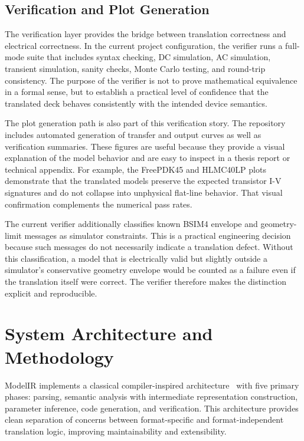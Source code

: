 \documentclass[10pt,twocolumn]{article}
\begin{document}
\subsection{Verification and Plot Generation}

The verification layer provides the bridge between translation correctness and electrical correctness. In the current project configuration, the verifier runs a full-mode suite that includes syntax checking, DC simulation, AC simulation, transient simulation, sanity checks, Monte Carlo testing, and round-trip consistency. The purpose of the verifier is not to prove mathematical equivalence in a formal sense, but to establish a practical level of confidence that the translated deck behaves consistently with the intended device semantics.

The plot generation path is also part of this verification story. The repository includes automated generation of transfer and output curves as well as verification summaries. These figures are useful because they provide a visual explanation of the model behavior and are easy to inspect in a thesis report or technical appendix. For example, the FreePDK45 and HLMC40LP plots demonstrate that the translated models preserve the expected transistor I-V signatures and do not collapse into unphysical flat-line behavior. That visual confirmation complements the numerical pass rates.

The current verifier additionally classifies known BSIM4 envelope and geometry-limit messages as simulator constraints. This is a practical engineering decision because such messages do not necessarily indicate a translation defect. Without this classification, a model that is electrically valid but slightly outside a simulator's conservative geometry envelope would be counted as a failure even if the translation itself were correct. The verifier therefore makes the distinction explicit and reproducible.

\section{System Architecture and Methodology}
\label{sec:architecture}

ModelIR implements a classical compiler-inspired architecture~\cite{compiler_design, lex_yacc} with five primary phases: parsing, semantic analysis with intermediate representation construction, parameter inference, code generation, and verification. This architecture provides clean separation of concerns between format-specific and format-independent translation logic, improving maintainability and extensibility.
\end{document}
